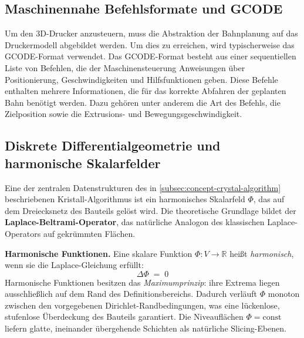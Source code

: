         \subsection{Maschinennahe Befehlsformate und \texorpdfstring{\ac{GCODE}}{G-Code}}\label{subsec:machine-near-command-formats-and-gcode}
        Um den 3D-Drucker anzusteuern, muss die Abstraktion der Bahnplanung auf das Druckermodell abgebildet werden.
        Um dies zu erreichen, wird typischerweise das \ac{GCODE}-Format verwendet.
        Das \ac{GCODE}-Format besteht aus einer sequentiellen Liste von Befehlen, die der Maschinensteuerung Anweisungen über Positionierung, Geschwindigkeiten und Hilfsfunktionen geben.
        Diese Befehle enthalten mehrere Informationen, die für das korrekte Abfahren der geplanten Bahn benötigt werden.
        Dazu gehören unter anderem die Art des Befehls, die Zielposition sowie die Extrusions- und Bewegungsgeschwindigkeit.

        \subsection{Diskrete Differentialgeometrie und harmonische Skalarfelder}\label{subsec:harmonic-scalar-fields}
        Eine der zentralen Datenstrukturen des in \cref{subsec:concept-crystal-algorithm} beschriebenen
        Kristall-Algorithmus ist ein harmonisches Skalarfeld $\Phi$, das auf dem Dreiecksnetz
        des Bauteils gelöst wird.
        Die theoretische Grundlage bildet der \textbf{Laplace-Beltrami-Operator},
        das natürliche Analogon des klassischen Laplace-Operators auf gekrümmten Flächen.

        \textbf{Harmonische Funktionen.}
        Eine skalare Funktion $\Phi \colon V \to \mathbb{R}$ heißt \emph{harmonisch},
        wenn sie die Laplace-Gleichung erfüllt:
        \begin{equation}
            \Delta \Phi \;=\; 0
            \label{eq:laplace}
        \end{equation}
        Harmonische Funktionen besitzen das \emph{Maximumprinzip}:
        ihre Extrema liegen ausschließlich auf dem Rand des Definitionsbereichs.
        Dadurch verläuft $\Phi$ monoton zwischen den vorgegebenen Dirichlet-Randbedingungen,
        was eine lückenlose, stufenlose Überdeckung des Bauteils garantiert.
        Die Niveauflächen $\Phi = \mathrm{const}$ liefern glatte, ineinander übergehende Schichten
        als natürliche Slicing-Ebenen.

